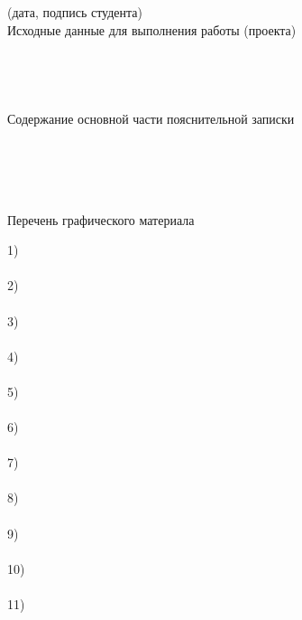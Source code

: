 \begin{titlepage}
\begin{flushleft}
		\vspace{-.2cm}\hspace{9.5cm}\footnotesize(дата, подпись студента)
			\normalsize\\
		\vspace{.3cm}
		Исходные данные для выполнения работы (проекта)\\
		\hrulefill\\
		\hrulefill\\
		\hrulefill\\
		\hrulefill\\
		Содержание основной части пояснительной записки\\
		\hrulefill\\
		\hrulefill\\
		\hrulefill\\
		\hrulefill\\

		\begin{center}
	    	Перечень графического материала\\
		\end{center}
		1) \hrulefill\\
		\hrulefill\\
		2) \hrulefill\\
		\hrulefill\\
		3) \hrulefill\\
		\hrulefill\\
		4) \hrulefill\\
		\hrulefill\\
		5) \hrulefill\\
		\hrulefill\\
		6) \hrulefill\\
		\hrulefill\\
		7) \hrulefill\\
		\hrulefill\\
		8) \hrulefill\\
		\hrulefill\\
		9) \hrulefill\\
		\hrulefill\\
		10) \hrulefill\\
		\hrulefill\\
		11) \hrulefill\\
		\hrulefill\\


\end{flushleft}
\end{titlepage}
